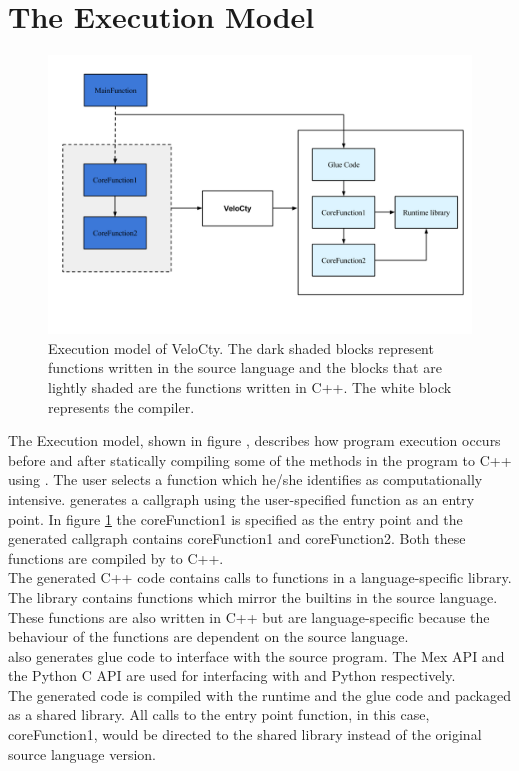 \section{The Execution Model} 
\begin{figure}[htbp]
\begin{center}
\includegraphics[scale=0.4]{Figures/WorkingDetails.png}
\caption[Execution Model]{Execution model of VeloCty. The dark shaded blocks represent functions written in the source language and the blocks that are lightly shaded are the functions written in C++. The white block represents the \velocty compiler.}\label{Fig:working}
\end{center}
\end{figure}
The Execution model, shown in figure , describes how program execution occurs before and after statically compiling some of the methods in the program to C++ using \velocty. The user selects a function which he/she identifies as computationally intensive. \velocty generates a callgraph using the user-specified function as an entry point. In figure \ref{Fig:working} the coreFunction1 is specified as the entry point and the  generated callgraph contains coreFunction1 and coreFunction2. Both these functions are compiled by \velocty to C++.\\
The generated C++ code contains calls to functions in a language-specific library. The library contains functions which mirror the builtins in the source language. These functions are also written in C++ but are language-specific because the behaviour of the functions are dependent on the source language.\\
\velocty also generates glue code to interface with the source program. The Mex API and the Python C API are used for interfacing with \matlab and Python respectively.\\
The generated code is compiled with the runtime and the glue code and packaged as a shared library. All calls to the entry point function, in this case, coreFunction1, would be directed to the shared library instead of the original source language version.\\
